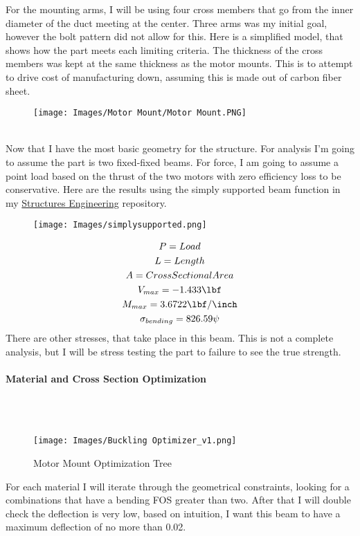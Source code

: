 \documentclass[12pt,letterpaper]{article}
\begin{document}
For the mounting arms, I will be using four cross members that go from the inner diameter of the duct meeting at the center. Three arms was my initial goal, however the bolt pattern did not allow for this. Here is a simplified model, that shows how the part meets each limiting criteria. The thickness of the cross members was kept at the same thickness as the motor mounts. This is to attempt to drive cost of manufacturing down, assuming this is made out of carbon fiber sheet.
\begin{figure}[h]
    \centering
    \texttt{[image: Images/Motor Mount/Motor Mount.PNG]}
    \caption{}
    \label{fig:my_label}
\end{figure}
\\
Now that I have the most basic geometry for the structure. For analysis I'm going to assume the part is two fixed-fixed beams. For force, I am going to assume a point load based on the thrust of the two motors with zero efficiency loss to be conservative. Here are the results using the simply supported beam function in my \href{https://github.com/ControlSoup/StructuresEngineering}{Structures Engineering} repository.



\begin{figure}[h]
    \centering
    \texttt{[image: Images/simplysupported.png]}
    \caption{}
    \label{fig:my_label}
\end{figure}


\begin{gather*}
    P = Load\\
    L= Length\\
    A = Cross Sectional Area
    \\
    V_{max} = -1.433\unit{\lbf}\\
    M_{max} = 3.6722\unit[per-mode = fraction]{\lbf\per\inch}\\
    \sigma_{bending} = 826.59\unit{\psi}\\
\end{gather*}
There are other stresses, that take place in this beam. This is not a complete analysis, but I will be stress testing the part to failure to see the true strength.



\paragraph{Material and Cross Section Optimization}
\setcounter{tocdepth}{4}
\setcounter{secnumdepth}{4}
\mbox{}\\\\
\begin{figure}[h]
    \centering
    \texttt{[image: Images/Buckling Optimizer\_v1.png]}
    \caption{Motor Mount Optimization Tree}
    \label{fig:my_label}
\end{figure}
For each material I will iterate through the geometrical constraints, looking for a combinations that have a bending FOS greater than two. After that I will double check the deflection is very low, based on intuition, I want this beam to have a maximum deflection of no more than 0.02\unit{\inch}.
\end{document}
